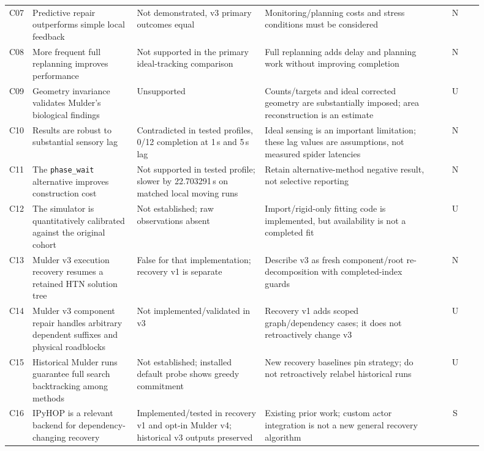 {\begin{longtable}{@{}p{0.045\linewidth}p{0.22\linewidth}p{0.27\linewidth}p{0.36\linewidth}c@{}}
C07 & Predictive repair outperforms simple local feedback & Not demonstrated, v3 primary outcomes equal &
  Monitoring/planning costs and stress conditions must be considered & N \\
C08 & More frequent full replanning improves performance & Not supported in the primary ideal-tracking comparison
  & Full replanning adds delay and planning work without improving completion & N \\
C09 & Geometry invariance validates Mulder's biological findings & Unsupported & Counts/targets and ideal
  corrected geometry are substantially imposed; area reconstruction is an estimate & U \\
C10 & Results are robust to substantial sensory lag & Contradicted in tested profiles, 0/12 completion at 1\,s
  and 5\,s lag & Ideal sensing is an important limitation; these lag values are assumptions, not measured spider
  latencies & N \\
C11 & The \texttt{phase\_wait} alternative improves construction cost & Not supported in tested profile; slower by
  22.703291\,s on matched local moving runs & Retain alternative-method negative result, not selective reporting & N \\
C12 & The simulator is quantitatively calibrated against the original cohort & Not established; raw observations
  absent & Import/rigid-only fitting code is implemented, but availability is not a completed fit & U \\
C13 & Mulder v3 execution recovery resumes a retained HTN solution tree & False for that implementation; recovery
  v1 is separate & Describe v3 as fresh component/root re-decomposition with completed-index guards & N \\
C14 & Mulder v3 component repair handles arbitrary dependent suffixes and physical roadblocks & Not
  implemented/validated in v3 & Recovery v1 adds scoped graph/dependency cases; it does not retroactively change
  v3 & U \\
C15 & Historical Mulder runs guarantee full search backtracking among methods & Not established; installed default
  probe shows greedy commitment & New recovery baselines pin strategy; do not retroactively relabel historical runs
  & U \\
C16 & IPyHOP is a relevant backend for dependency-changing recovery & Implemented/tested in recovery v1 and opt-in
  Mulder v4; historical v3 outputs preserved & Existing prior work; custom actor integration is not a new general
  recovery algorithm & S \\

\end{longtable}}
